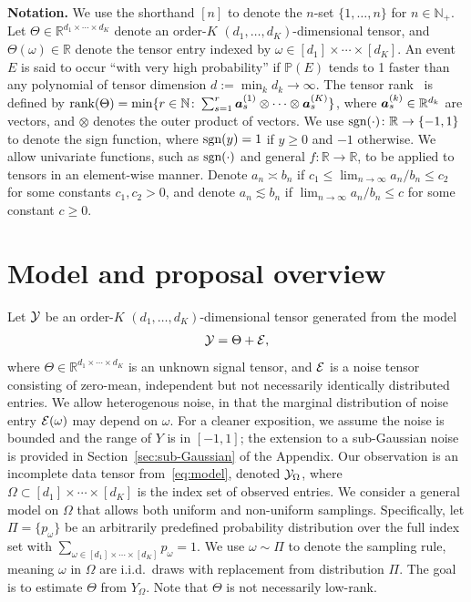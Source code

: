 \documentclass{article}
\theoremstyle{plain}
\theoremstyle{definition}
\def\sign{\textup{sgn}}
\begin{document}
{\bf Notation.} We use the shorthand $[n]$ to denote the $n$-set $\{1,\ldots,n\}$ for $n\in\mathbb{N}_{+}$. Let $\Theta\in\mathbb{R}^{d_1\times \cdots \times d_K}$ denote an order-$K$ $(d_1,\ldots,d_K)$-dimensional tensor, and $\Theta(\omega)\in\mathbb{R}$ denote the tensor entry indexed by $\omega \in[d_1]\times \cdots \times [d_K]$. An event $E$ is said to occur ``with very high probability'' if $\mathbb{P}(E)$ tends to 1 faster than any polynomial of tensor dimension $d:=\min_k d_k \to\infty$. The tensor rank~\citep{hitchcock1927expression} is defined by $\text{rank}(\Theta)=\min\{r\in\mathbb{N}\colon \sum_{s=1}^r\bm{a}^{(1)}_s\otimes\cdots\otimes \bm{a}^{(K)}_s\}$, where $\bm{a}^{(k)}_s\in\mathbb{R}^{d_k}$ are vectors, and $\otimes$ denotes the outer product of vectors. We use $\sign(\cdot)\colon \mathbb{R}\to\{-1,1\}$ to denote the sign function, where $\sign(y)=1$ if $y\geq 0$ and $-1$ otherwise. We allow univariate functions, such as $\sign(\cdot)$ and general $f\colon \mathbb{R}\to\mathbb{R}$, to be applied to tensors in an element-wise manner. Denote $a_n\asymp b_n$ if $c_1\leq \lim_{n\to \infty} a_n/b_n\leq c_2$ for some constants $c_1,c_2>0$, and denote $a_n\lesssim b_n$ if $\lim_{n\to\infty} a_n/b_n\leq c$ for some constant $c\geq 0$. 

\vspace{-.2cm}
\section{Model and proposal overview}\label{sec:overview}
Let $\mathcal{Y}$ be an order-$K$ $(d_1,\ldots,d_K)$-dimensional tensor generated from the model
\begin{equation}\label{eq:model}
\mathcal{Y}=\Theta+\mathcal{E},
\end{equation}
where $\Theta\in\mathbb{R}^{d_1\times \cdots \times d_K}$ is an unknown signal tensor, and $\mathcal{E}$ is a noise tensor consisting of zero-mean, independent but not necessarily identically distributed entries. We allow heterogenous noise, in that the marginal distribution of noise entry $\mathcal{E}(\omega)$ may depend on $\omega$. For a cleaner exposition, we assume the noise is bounded and the range of $Y$ is in $[-1,1]$; the extension to a sub-Gaussian noise is provided in Section~\ref{sec:sub-Gaussian} of the Appendix. Our observation is an incomplete data tensor from~\eqref{eq:model}, denoted  $\mathcal{Y}_\Omega$, where $\Omega\subset[d_1]\times\cdots\times[d_K]$ is the index set of observed entries. We consider a general model on $\Omega$ that allows both uniform and non-uniform samplings. Specifically, let $\Pi=\{p_\omega\}$ be an arbitrarily predefined probability distribution over the full index set with $\sum_{\omega\in[d_1]\times \cdots \times [d_K]}p_\omega=1$. We use $\omega\sim \Pi$ to denote the sampling rule, meaning $\omega$ in $\Omega$ are i.i.d.\ draws with replacement from distribution $\Pi$. The goal is to estimate $\Theta$ from $Y_{\Omega}$. Note that $\Theta$ is not necessarily low-rank. 
\end{document}
